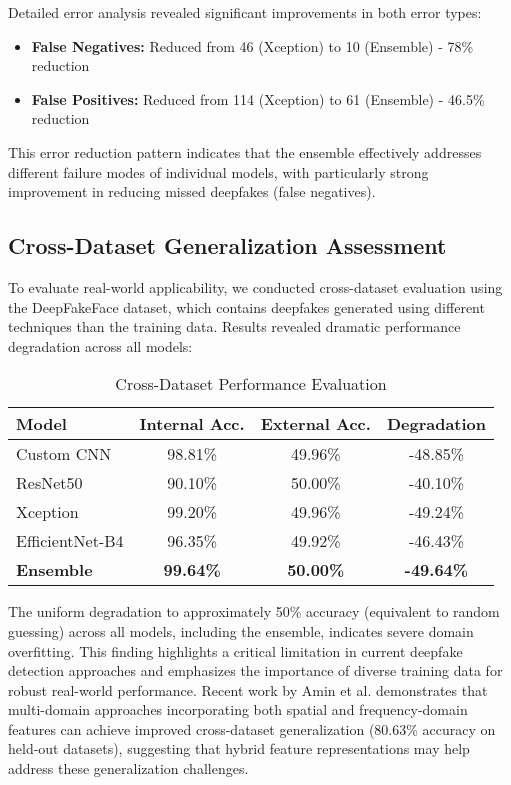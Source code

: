 \documentclass[conference]{IEEEtran}
\begin{document}
Detailed error analysis revealed significant improvements in both error types:
\begin{itemize}
\item \textbf{False Negatives:} Reduced from 46 (Xception) to 10 (Ensemble) - 78\% reduction
\item \textbf{False Positives:} Reduced from 114 (Xception) to 61 (Ensemble) - 46.5\% reduction
\end{itemize}

This error reduction pattern indicates that the ensemble effectively addresses different failure modes of individual models, with particularly strong improvement in reducing missed deepfakes (false negatives).

\subsection{Cross-Dataset Generalization Assessment}

To evaluate real-world applicability, we conducted cross-dataset evaluation using the DeepFakeFace dataset, which contains deepfakes generated using different techniques than the training data. Results revealed dramatic performance degradation across all models:

\begin{table}[htbp]
\caption{Cross-Dataset Performance Evaluation}
\begin{center}
\begin{tabular}{lccc}
\toprule
\textbf{Model} & \textbf{Internal Acc.} & \textbf{External Acc.} & \textbf{Degradation} \\
\midrule
Custom CNN & 98.81\% & 49.96\% & -48.85\% \\
ResNet50 & 90.10\% & 50.00\% & -40.10\% \\
Xception & 99.20\% & 49.96\% & -49.24\% \\
EfficientNet-B4 & 96.35\% & 49.92\% & -46.43\% \\
\textbf{Ensemble} & \textbf{99.64\%} & \textbf{50.00\%} & \textbf{-49.64\%} \\
\bottomrule
\end{tabular}
\label{tab:cross_dataset_results}
\end{center}
\end{table}

The uniform degradation to approximately 50\% accuracy (equivalent to random guessing) across all models, including the ensemble, indicates severe domain overfitting. This finding highlights a critical limitation in current deepfake detection approaches and emphasizes the importance of diverse training data for robust real-world performance. Recent work by Amin et al. \cite{amin2024svft} demonstrates that multi-domain approaches incorporating both spatial and frequency-domain features can achieve improved cross-dataset generalization (80.63\% accuracy on held-out datasets), suggesting that hybrid feature representations may help address these generalization challenges.
\end{document}
